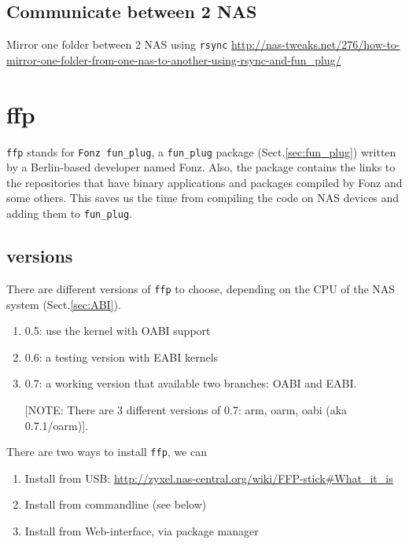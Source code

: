 \subsection{Communicate between 2 NAS}

Mirror one folder between 2 NAS using \verb!rsync!
\url{http://nas-tweaks.net/276/how-to-mirror-one-folder-from-one-nas-to-another-using-rsync-and-fun_plug/}

\section{ffp}
\label{sec:ffp}

\verb!ffp! stands for \verb!Fonz fun_plug!, a \verb!fun_plug! package
(Sect.\ref{sec:fun_plug}) written by a Berlin-based developer named Fonz.
Also, the package contains the links to the repositories that have binary
applications and packages compiled by Fonz and some others. This saves us the
time from compiling the code on NAS devices and adding them to \verb!fun_plug!.

\subsection{versions}
\label{sec:ffp_versions}

There are different versions of \verb!ffp! to choose, depending on the CPU of
the NAS system (Sect.\ref{sec:ABI}).
\begin{enumerate}
  \item 0.5: use the kernel with OABI support 
  \item 0.6: a testing version with EABI kernels
  \item 0.7: a working version that available two branches: OABI and EABI. 

[NOTE: There are 3 different versions of 0.7: arm, oarm, oabi (aka 0.7.1/oarm)].
\end{enumerate}

There are two ways to install \verb!ffp!, we can
\begin{enumerate}
  \item Install from USB:
  \url{http://zyxel.nas-central.org/wiki/FFP-stick#What_it_is}
  
  \item Install from commandline (see below)
  
  \item Install from Web-interface, via package manager
\end{enumerate}

